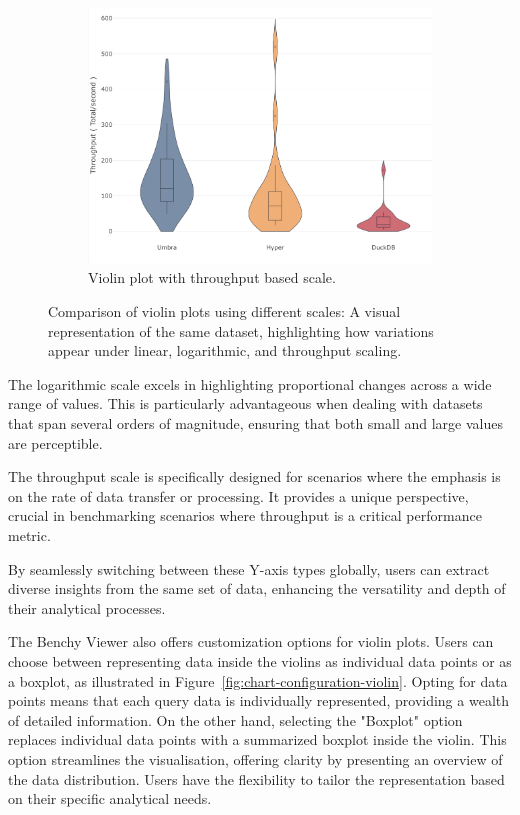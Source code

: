 \begin{figure}[h]
  \begin{subfigure}[b]{0.3\linewidth}
    \includegraphics[width=\linewidth]{figures/scale-throughput.png}
    \caption{Violin plot with throughput based scale.}
      \label{fig:scale-throughput}
  \end{subfigure}
  \caption{Comparison of violin plots using different scales: A visual representation of the same dataset, highlighting how variations appear under linear, logarithmic, and throughput scaling.}
  \label{fig:scale-comparison.}
\end{figure}

The logarithmic scale excels in highlighting proportional changes across a wide range of values. This is particularly advantageous when dealing with datasets that span several orders of magnitude, ensuring that both small and large values are perceptible.

The throughput scale is specifically designed for scenarios where the emphasis is on the rate of data transfer or processing. It provides a unique perspective, crucial in benchmarking scenarios where throughput is a critical performance metric.

By seamlessly switching between these Y-axis types globally, users can extract diverse insights from the same set of data, enhancing the versatility and depth of their analytical processes.


The Benchy Viewer also offers customization options for violin plots. Users can choose between representing data inside the violins as individual data points or as a boxplot, as illustrated in Figure~\ref{fig:chart-configuration-violin}. Opting for data points means that each query data is individually represented, providing a wealth of detailed information. On the other hand, selecting the "Boxplot" option replaces individual data points with a summarized boxplot inside the violin. This option streamlines the visualisation, offering clarity by presenting an overview of the data distribution. Users have the flexibility to tailor the representation based on their specific analytical needs.

